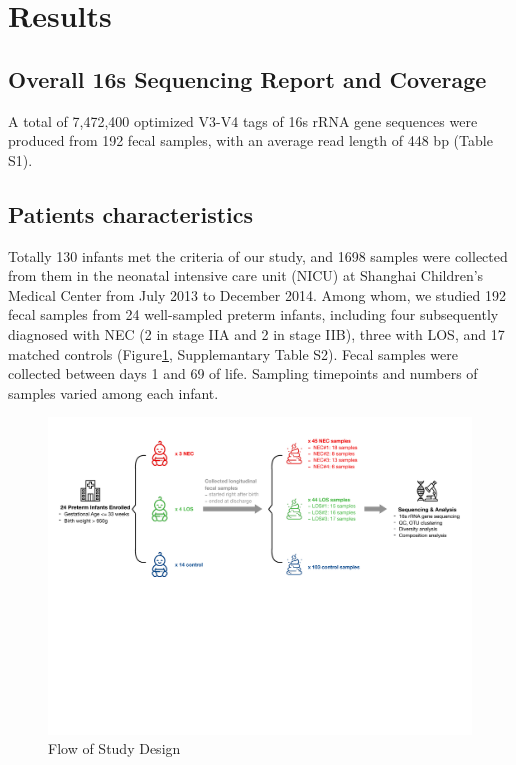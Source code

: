 \documentclass[fleqn,10pt, lineno]{wlpeerj} %
\begin{document}
\section*{Results}
  \subsection*{Overall 16s Sequencing Report and Coverage}
  A total of 7,472,400 optimized V3-V4 tags of 16s rRNA gene sequences were produced from 192 fecal samples, with an average read length of 448 bp (Table S1).

  \subsection*{Patients characteristics}
   Totally 130 infants met the criteria of our study, and 1698 samples were collected from them in the neonatal intensive care unit (NICU) at Shanghai Children’s Medical Center from July 2013 to December 2014.  Among whom, we studied 192 fecal samples from 24 well-sampled preterm infants, including four subsequently diagnosed with NEC (2 in stage IIA and 2 in stage IIB), three with LOS, and 17 matched controls (Figure\ref{fig:design}, Supplemantary Table S2). Fecal samples were collected between days 1 and 69 of life. Sampling timepoints and numbers of samples varied among each infant.
     \begin{figure}[ht]\centering
       \includegraphics[width=\linewidth]{figure/design.pdf}
       \caption{Flow of Study Design}
       \label{fig:design}
     \end{figure}
\end{document}
